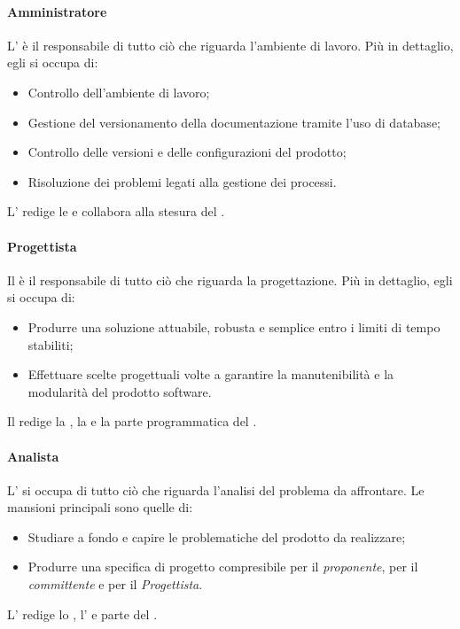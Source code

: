 \paragraph{Amministratore}
L'\textit{\Amm} è il responsabile di tutto ciò che riguarda l'ambiente di
lavoro. Più in dettaglio, egli si occupa di:
\begin{itemize}
  \item Controllo dell'ambiente di lavoro;
  \item Gestione del versionamento della documentazione tramite l'uso di
  database;
  \item Controllo delle versioni e delle configurazioni del prodotto;
  \item Risoluzione dei problemi legati alla gestione dei processi.
\end{itemize}
L'\textit{\Amm} redige le \textit{\NdP} e collabora alla stesura del
\textit{\PdP}.

\paragraph{Progettista}
Il \textit{\Prog} è il responsabile di tutto ciò che riguarda la progettazione.
Più in dettaglio, egli si occupa di:
\begin{itemize}
  \item Produrre una soluzione attuabile, robusta e semplice entro i limiti di
  tempo stabiliti;
  \item Effettuare scelte progettuali volte a garantire la manutenibilità e la
  modularità del prodotto software.
\end{itemize}
Il \textit{\Prog} redige la \textit{\ST}, la \textit{\DDP} e la parte
programmatica del \textit{\PdQ}.

\paragraph{Analista}
L'\textit{\Ana} si occupa di tutto ciò che riguarda l'analisi del problema da
affrontare. Le mansioni principali sono quelle di:
\begin{itemize}
  \item Studiare a fondo e capire le problematiche del prodotto da realizzare;
  \item Produrre una specifica di progetto compresibile per il
  \textit{proponente}, per il \textit{committente} e per il
  \textit{Progettista}.
\end{itemize}
L'\textit{\Ana} redige lo \textit{\SdF}, l'\textit{\AdR} e parte del
\textit{\PdQ}.

